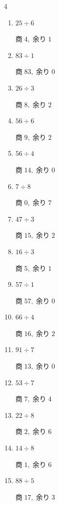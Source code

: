 \begin{multicols}{4}
\begin{enumerate}
  \item $25 \div 6$

        $商\; 4,\; 余り\; 1$

  \item $83 \div 1$

        $商\; 83,\; 余り\; 0$

  \item $26 \div 3$

        $商\; 8,\; 余り\; 2$

  \item $56 \div 6$

        $商\; 9,\; 余り\; 2$

  \item $56 \div 4$

        $商\; 14,\; 余り\; 0$

  \item $7 \div 8$

        $商\; 0,\; 余り\; 7$

\columnbreak %

  \item $47 \div 3$

        $商\; 15,\; 余り\; 2$

  \item $16 \div 3$

        $商\; 5,\; 余り\; 1$

  \item $57 \div 1$

        $商\; 57,\; 余り\; 0$

  \item $66 \div 4$

        $商\; 16,\; 余り\; 2$

  \item $91 \div 7$

        $商\; 13,\; 余り\; 0$

  \item $53 \div 7$

        $商\; 7,\; 余り\; 4$

  \item $22 \div 8$

        $商\; 2,\; 余り\; 6$

  \item $14 \div 8$

        $商\; 1,\; 余り\; 6$

  \item $88 \div 5$

        $商\; 17,\; 余り\; 3$


\end{enumerate}
\end{multicols}
